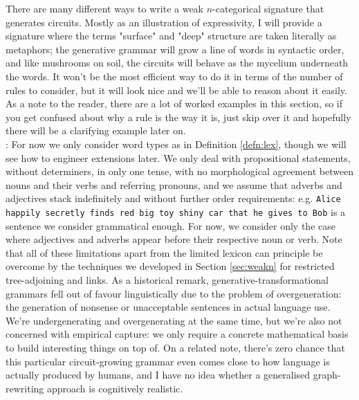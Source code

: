 There are many different ways to write a weak $n$-categorical signature that generates circuits. Mostly as an illustration of expressivity, I will provide a signature where the terms "surface" and "deep" structure are taken literally as metaphors; the generative grammar will grow a line of words in syntactic order, and like mushrooms on soil, the circuits will behave as the mycelium underneath the words. It won't be the most efficient way to do it in terms of the number of rules to consider, but it will look nice and we'll be able to reason about it easily. As a note to the reader, there are a lot of worked examples in this section, so if you get confused about why a rule is the way it is, just skip over it and hopefully there will be a clarifying example later on.\\

: For now we only consider word types as in Definition \ref{defn:lex}, though we will see how to engineer extensions later. We only deal with propositional statements, without determiners, in only one tense, with no morphological agreement between nouns and their verbs and referring pronouns, and we assume that adverbs and adjectives stack indefinitely and without further order requirements: e.g. \texttt{Alice happily secretly finds red big toy shiny car that he gives to Bob} is a sentence we consider grammatical enough. For now, we consider only the case where adjectives and adverbs appear before their respective noun or verb. Note that all of these limitations apart from the limited lexicon can principle be overcome by the techniques we developed in Section \ref{sec:weakn} for restricted tree-adjoining and links. As a historical remark, generative-transformational grammars fell out of favour linguistically due to the problem of overgeneration: the generation of nonsense or unacceptable sentences in actual language use. We're undergenerating and overgenerating at the same time, but we're also not concerned with empirical capture: we only require a concrete mathematical basis to build interesting things on top of. On a related note, there's zero chance that this particular circuit-growing grammar even comes close to how language is actually produced by humans, and I have no idea whether a generalised graph-rewriting approach is cognitively realistic.

